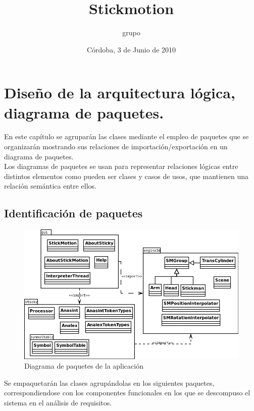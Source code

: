 \documentclass[11pt,a4paper]{report}
\title{Stickmotion}
\author{grupo}
\date{Córdoba, 3 de Junio de 2010}
\begin{document}
\maketitle

\setcounter{tocdepth}{3}
\tableofcontents
\vspace*{1cm}





\chapter{Diseño de la arquitectura lógica, diagrama de paquetes.}
\label{sec-1}


En este capítulo se agruparán las clases mediante el empleo de paquetes que se organizarán mostrando sus relaciones de importación/exportación en un diagrama de paquetes. \\

Los diagramas de paquetes se usan para representar relaciones
lógicas entre distintos elementos como pueden ser clases y casos de
usos, que mantienen una relación semántica entre ellos. \\

\section{Identificación de paquetes}
\label{sec-1.1}


\begin{figure}[htb]
\centerline{\includegraphics[width=\textwidth]{imagenes/paquetes.png}}
\caption{\label{fig:dpaquetes}Diagrama de paquetes de la aplicación}
\end{figure}


Se empaquetarán las clases agrupándolas en los siguientes paquetes, correspondiendose con los componentes funcionales en los que se descompuso el sistema en el análisis de requisitos. \\
\end{document}
